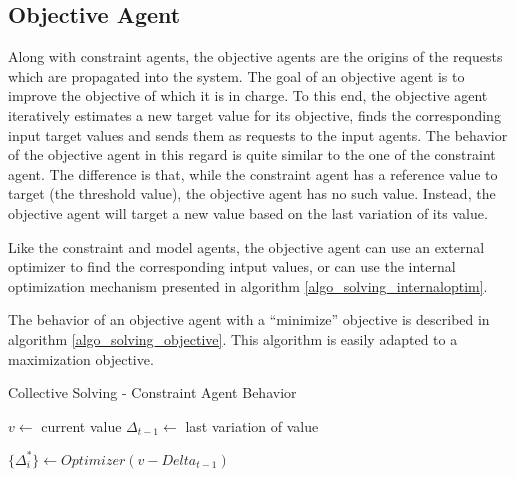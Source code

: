 \subsection{Objective Agent}

Along with constraint agents, the objective agents are the origins of the requests which are propagated into the system. The goal of an objective agent is to improve the objective of which it is in charge. To this end, the objective agent iteratively estimates a new target value for its objective, finds the corresponding input target values and sends them as requests to the input agents. The behavior of the objective agent in this regard is quite similar to the one of the constraint agent. The difference is that, while the constraint agent has a reference value to target (the threshold value), the objective agent has no such value. Instead, the objective agent will target a new value based on the last variation of its value.

Like the constraint and model agents, the objective agent can use an external optimizer to find the corresponding intput values, or can use the internal optimization mechanism presented in algorithm \ref{algo_solving_internaloptim}.

The behavior of an objective agent with a \enquote{minimize} objective is described in algorithm \ref{algo_solving_objective}. This algorithm is easily adapted to a maximization objective.

\begin{algorithm}
\caption{Collective Solving - Constraint Agent Behavior}
\label{algo_solving_objective}

$v \leftarrow $ current value\;
$\Delta_{t-1} \leftarrow $ last variation of value \;

\BlankLine
$\{ \Delta^*_i \} \leftarrow Optimizer(v - Delta_{t-1})$\;
	
\end{algorithm}

